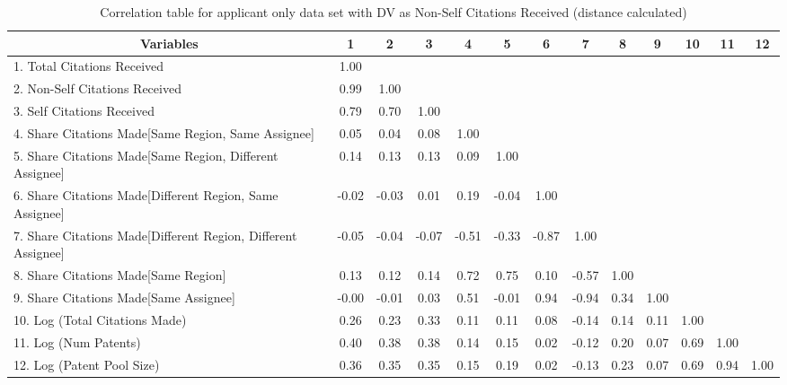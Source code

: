 \begin{table}[htbp]\centering \caption{Correlation table for applicant only data set with DV as Non-Self Citations Received (distance calculated)\label{a.ncorrelation}}
\scriptsize
\singlespacing
\begin{tabular}{l  c  c  c  c  c  c  c  c  c  c  c  c }\hline\hline
\multicolumn{1}{c}{Variables} &1&2&3&4&5&6&7&8&9&10&11&12\\ \hline
1. Total Citations Received&1.00\\
2. Non-Self Citations Received&0.99&1.00\\
3. Self Citations Received&0.79&0.70&1.00\\
4. Share Citations Made[Same Region, Same Assignee]&0.05&0.04&0.08&1.00\\
5. Share Citations Made[Same Region, Different Assignee]&0.14&0.13&0.13&0.09&1.00\\
6. Share Citations Made[Different Region, Same Assignee]&-0.02&-0.03&0.01&0.19&-0.04&1.00\\
7. Share Citations Made[Different Region, Different Assignee]&-0.05&-0.04&-0.07&-0.51&-0.33&-0.87&1.00\\
8. Share Citations Made[Same Region]&0.13&0.12&0.14&0.72&0.75&0.10&-0.57&1.00\\
9. Share Citations Made[Same Assignee]&-0.00&-0.01&0.03&0.51&-0.01&0.94&-0.94&0.34&1.00\\
10. Log (Total Citations Made)&0.26&0.23&0.33&0.11&0.11&0.08&-0.14&0.14&0.11&1.00\\
11. Log (Num Patents)&0.40&0.38&0.38&0.14&0.15&0.02&-0.12&0.20&0.07&0.69&1.00\\
12. Log (Patent Pool Size)&0.36&0.35&0.35&0.15&0.19&0.02&-0.13&0.23&0.07&0.69&0.94&1.00\\
\hline \hline 
 \end{tabular}
\end{table}
